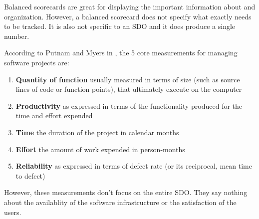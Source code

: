 \documentclass[SDSUThesis.tex]{subfiles}
\begin{document}
Balanced scorecards are great for displaying the important information about
and organization.  However, a balanced scorecard does not specify what
exactly needs to be tracked.  It is also not specific to an SDO and 
it does produce a single number.




According to Putnam and Myers in \cite{Putnam2013}, the 5 core measurements for managing software
projects are:

\begin{enumerate}
    \item \textbf{Quantity of function} usually measured in terms of size (such as source lines of code or function points), that ultimately execute on the computer
    \item \textbf{Productivity} as expressed in terms of the functionality produced for the time and effort expended
    \item \textbf{Time} the duration of the project in calendar months
    \item \textbf{Effort} the amount of work expended in person-months
    \item \textbf{Reliability} as expressed in terms of defect rate (or its reciprocal, mean time to defect)
\end{enumerate}
However, these measurements don't focus on the entire SDO. They say nothing about the availablity of the software infrastructure or the satisfaction of the users.
\end{document}
